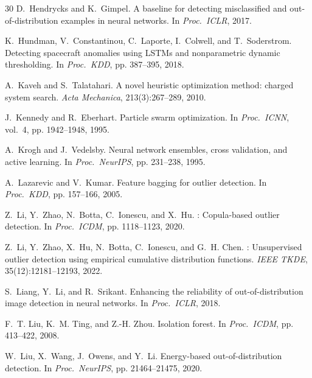 \documentclass{article}
\begin{document}
\begin{thebibliography}{30}
D.~Hendrycks and K.~Gimpel.
\newblock A baseline for detecting misclassified and out-of-distribution examples in neural networks.
\newblock In \emph{Proc.\ ICLR}, 2017.

K.~Hundman, V.~Constantinou, C.~Laporte, I.~Colwell, and T.~Soderstrom.
\newblock Detecting spacecraft anomalies using {LSTM}s and nonparametric dynamic thresholding.
\newblock In \emph{Proc.\ KDD}, pp. 387--395, 2018.

A.~Kaveh and S.~Talatahari.
\newblock A novel heuristic optimization method: charged system search.
\newblock \emph{Acta Mechanica}, 213(3):267--289, 2010.

J.~Kennedy and R.~Eberhart.
\newblock Particle swarm optimization.
\newblock In \emph{Proc.\ ICNN}, vol.~4, pp. 1942--1948, 1995.

A.~Krogh and J.~Vedelsby.
\newblock Neural network ensembles, cross validation, and active learning.
\newblock In \emph{Proc.\ NeurIPS}, pp. 231--238, 1995.

A.~Lazarevic and V.~Kumar.
\newblock Feature bagging for outlier detection.
\newblock In \emph{Proc.\ KDD}, pp. 157--166, 2005.

Z.~Li, Y.~Zhao, N.~Botta, C.~Ionescu, and X.~Hu.
: Copula-based outlier detection.
\newblock In \emph{Proc.\ ICDM}, pp. 1118--1123, 2020.

Z.~Li, Y.~Zhao, X.~Hu, N.~Botta, C.~Ionescu, and G.~H. Chen.
: Unsupervised outlier detection using empirical cumulative distribution functions.
\newblock \emph{IEEE TKDE}, 35(12):12181--12193, 2022.

S.~Liang, Y.~Li, and R.~Srikant.
\newblock Enhancing the reliability of out-of-distribution image detection in neural networks.
\newblock In \emph{Proc.\ ICLR}, 2018.

F.~T. Liu, K.~M. Ting, and Z.-H. Zhou.
\newblock Isolation forest.
\newblock In \emph{Proc.\ ICDM}, pp. 413--422, 2008.

W.~Liu, X.~Wang, J.~Owens, and Y.~Li.
\newblock Energy-based out-of-distribution detection.
\newblock In \emph{Proc.\ NeurIPS}, pp. 21464--21475, 2020.


\end{thebibliography}
\end{document}
